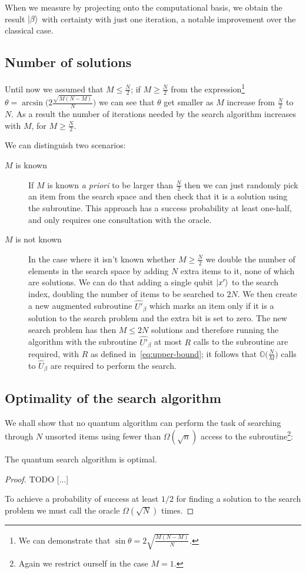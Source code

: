 When we measure by projecting onto the computational basis, we obtain the result $\ket{\beta}$ with certainty with just one iteration, a notable improvement over the classical case.

\subsection{Number of solutions}\label{sec:M}
Until now we assumed that $M\leq \frac{N}{2}$; if $M \geq \frac{N}{2}$ from the expression\footnote{We can demonstrate that $\sin\theta = 2\sqrt{\frac{M(N-M)}{N}}$.} $\theta=\arcsin\biggl(2\frac{\sqrt{M(N-M)}}{N}\biggr)$ we can see that $\theta$ get smaller as $M$ increase from $\frac{N}{2}$ to $N$. As a result the number of iterations needed by the search algorithm increases with $M$, for $M\geq \frac{N}{2}$.

We can distinguish two scenarios:
\begin{description}
   \item[$M$ is known] If $M$ is known \emph{a priori} to be larger than $\frac{N}{2}$ then we can just randomly pick an item from the search space and then check that it is a solution using the subroutine. This approach has a success probability at least one-half, and only requires one consultation with the oracle.
   \item[$M$ is not known] In the case where it isn't known whether $M\geq \frac{N}{2}$ we double the number of elements in the search space by adding $N$ extra items to it, none of which are solutions. We can do that adding a single qubit $\ket{x'}$ to the search index, doubling the number of items to be searched to $2N$. We then create a new augmented subroutine $\hat{U'}_\beta$ which marks an item only if it is a solution to the search problem and the extra bit is set to zero. The new search problem has then $M \leq 2N$ solutions and therefore running the algorithm with the subroutine $\hat{U'}_\beta$ at most $R$ calls to the subroutine are required, with $R$ as defined in~\ref{eq:upper-bound}; it follows that $\mathbb{O}\bigl(\frac{N}{M}\bigr)$ calls to $\hat{U}_\beta$ are required to perform the search.
   
\end{description}
\subsection{Optimality of the search algorithm}
We shall show that no quantum algorithm can perform the task of searching through $N$ unsorted items using fewer than $\Omega(\sqrt{n})$ access to the subroutine\footnote{Again we restrict ourself in the case $M=1$.}:
\begin{theorem}
The quantum search algorithm is optimal. 
\end{theorem}
\begin{proof}
TODO [...]

To achieve a probability of success at least $1/2$ for finding a solution to the search problem we must call the oracle $\Omega(\sqrt{N})$ times.
\end{proof}

